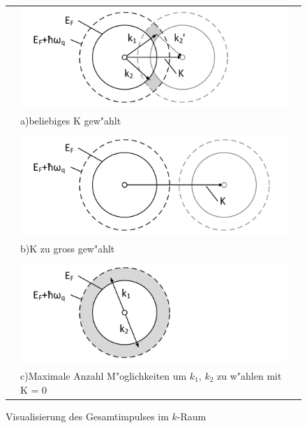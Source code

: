 \begin{refsection}
\begin{figure}
\centering
  \begin{tabular}{l l l}
  \centering
    &
    \begin{minipage}{0.6\textwidth}
	\includegraphics[width=1.2\textwidth]{supraleitung/Graphics/kGraphic05g.pdf}
    \end{minipage}
    &
    \\
    &
    a)\quad beliebiges K gew"ahlt 			%
    \\
    &
    \\
    &
    \begin{minipage}{0.6\textwidth}
	\includegraphics[width=1.2\textwidth]{supraleitung/Graphics/kGraphic06g.pdf} 
    \end{minipage}
    &
    \\
    &
    b)\quad K zu gross gew"ahlt							%
    \\
    &
    \\
    &
    \begin{minipage}{0.6\textwidth}
	\includegraphics[width=1.2\textwidth]{supraleitung/Graphics/kGraphic09g.pdf}
    \end{minipage}
    &
    \\
    &
    c)\quad Maximale Anzahl M"oglichkeiten um $k_1$, $k_2$ zu w"ahlen mit K = 0 	%
    &
    \\
  \end{tabular}
  \caption{Visualisierung des Gesamtimpulses im $k$-Raum
  \label{supraleitung:kRaum}}
\end{figure}


\end{refsection}
